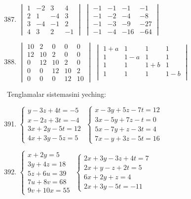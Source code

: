 \begin{enumerate}\setcounter{enumi}{386}
	\item $\begin{vmatrix}
		1&-2&3&4\\
		2&1&-4&3\\
		3&-4&-1&2\\
		4&3&2&-1
	\end{vmatrix}$
	\inlineitem
	$\begin{vmatrix}
		-1&-1&-1&-1\\
		-1&-2&-4&-8\\
		-1&-3&-9&-27\\
		-1&-4&-16&-64
	\end{vmatrix}$
\item$\begin{vmatrix}
	10&2&0&0&0\\
	12&10&2&0&0\\
	0&12&10&2&0\\
	0&0&12&10&2\\
	0&0&0&12&10
\end{vmatrix}$
	\inlineitem
	$\begin{vmatrix}
		1+a&1&1&1\\
		1&1-a&1&1\\
		1&1&1+b&1\\
		1&1&1&1-b\\
	\end{vmatrix}$
\end{enumerate}	

Tenglamalar sistemasini yeching:

\begin{enumerate}\setcounter{enumi}{390}
	\item $\begin{cases}
		y-3z+4t=-5\\
		x-2z+3t=-4\\
		3x+2y-5t=12\\
		4x+3y-5z=5
	\end{cases}$
\inlineitem
$\begin{cases}
	x-3y+5z-7t=12\\
	3x-5y+7z-t=0\\
	5x-7y+z-3t=4\\
	7x-y+3z-5t=16
\end{cases}$

\item $\begin{cases}
	x+2y=5\\
	3y+4z=18\\
	5z+6u=39\\
	7u+8v=68\\
	9v+10x=55
\end{cases}$
\inlineitem
$\begin{cases}
	2x+3y-3z+4t=7\\
	2x+y-z+2t=5\\
	6x+2y+z=4\\
	2x+3y-5t=-11
\end{cases}$

\end{enumerate}

